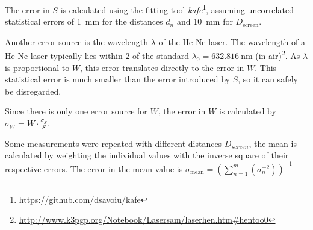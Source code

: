 The error in $S$ is calculated using the fitting tool \textit{kafe}\footnote{\url{https://github.com/dsavoiu/kafe}}, assuming uncorrelated statistical errors of \SI{1}{\mm} for the distances $d_n$ and \SI{10}{\mm} for $D_\text{screen}$.


Another error source is the wavelength $\lambda$ of the He-Ne laser.
The wavelength of a He-Ne laser typically lies within \SI{2}{\ppm} of the standard $\lambda_0 = \SI{632.816}{\nm}$ (in air)\footnote{\url{http://www.k3pgp.org/Notebook/Lasersam/laserhen.htm\#hentoo0}}.
As $\lambda$ is proportional to $W$, this error translates directly to the error in $W$.
This statistical error is much smaller than the error introduced by $S$, so it can safely be disregarded.

Since there is only one error source for $W$, the error in $W$ is calculated by $\sigma_W = W \cdot \frac{\sigma_S}{S}$.

Some measurements were repeated with different distances $D_{screen}$, the mean is calculated by weighting the individual values with the inverse square of their respective errors.
The error in the mean value is $\sigma_\text{mean} = \left(\sum_{n = 1}^m (\sigma_n^{-2})\right)^{-1}$
